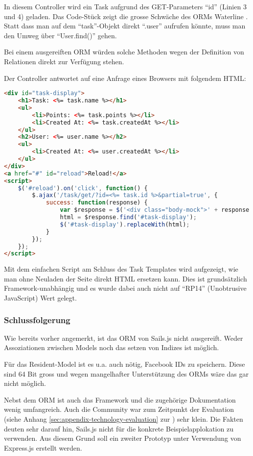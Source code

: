 In diesem Controller wird ein Task aufgrund des GET-Parameters ``id'' (Linien 3 und 4) geladen. Das Code-Stück zeigt die grosse Schwäche des ORMs Waterline \cite{Waterline}. Statt dass man auf dem ``task''-Objekt direkt ``.user'' aufrufen könnte, muss man den Umweg über ``User.find()'' gehen.

Bei einem ausgereiften ORM würden solche Methoden wegen der Definition von Relationen direkt zur Verfügung stehen.

Der Controller antwortet auf eine Anfrage eines Browsers mit folgendem HTML:

\begin{lstlisting}[language=HTML, caption=Task Template]
<div id="task-display">
	<h1>Task: <%= task.name %></h1>
	<ul>
		<li>Points: <%= task.points %></li>
		<li>Created At: <%= task.createdAt %></li>
	</ul>
	<h2>User: <%= user.name %></h2>
	<ul>
		<li>Created At: <%= user.createdAt %></li>
	</ul>
</div>
<a href="#" id="reload">Reload!</a>
<script>
	$('#reload').on('click', function() {
		$.ajax('/task/get/?id=<%= task.id %>&partial=true', {
			success: function(response) {
				var $response = $('<div class="body-mock">' + response + '</div>');
				html = $response.find('#task-display');
				$('#task-display').replaceWith(html);
			}
		});
	});
</script>
\end{lstlisting}

Mit dem einfachen Script am Schluss des Task Templates wird aufgezeigt, wie man ohne Neuladen der Seite direkt HTML ersetzen kann. Dies ist grundsätzlich Framework-unabhängig und es wurde dabei auch nicht auf ``RP14'' (Unobtrusive JavaScript) Wert gelegt.

\subsubsection*{Schlussfolgerung}

Wie bereits vorher angemerkt, ist das ORM von Sails.js nicht ausgereift. Weder Assoziationen zwischen Models \cite{SailsjsModelAssociations} noch das setzen von Indizes ist möglich.

Für das Resident-Model ist es u.a. auch nötig, Facebook IDs zu speichern. Diese sind 64 Bit gross und wegen mangelhafter Unterstützung des ORMs wäre das gar nicht möglich.

Nebst dem ORM ist auch das Framework und die zugehörige Dokumentation wenig umfangreich. Auch die Community war zum Zeitpunkt der Evaluation (siehe Anhang \ref{sec:appendix-technology-evaluation} zur ) sehr klein. Die Fakten deuten sehr darauf hin, Sails.js nicht für die konkrete Beispielapplokation zu verwenden. Aus diesem Grund soll ein zweiter Prototyp unter Verwendung von Express.js erstellt werden.